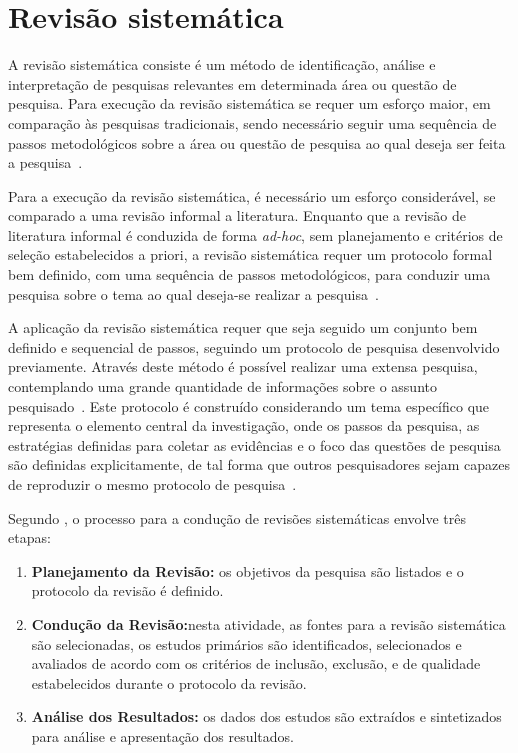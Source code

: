 \section{\label{sec:ApendiceA}Revisão sistemática}
\par
A revisão sistemática consiste é um método de identificação, análise e interpretação de pesquisas relevantes em determinada área ou questão de pesquisa. Para execução da revisão sistemática se requer um esforço maior, em comparação às pesquisas tradicionais, sendo necessário seguir uma sequência de passos metodológicos sobre a área ou questão de pesquisa ao qual deseja ser feita a pesquisa~\cite{kitchenham2004procedures}.

\par
Para a execução da revisão sistemática, é necessário um esforço considerável, se comparado a uma revisão informal a literatura. Enquanto que a revisão de literatura informal é conduzida de forma \textit{ad-hoc}, sem planejamento e critérios de seleção estabelecidos a priori, a revisão sistemática requer um protocolo formal bem definido, com uma sequência de passos metodológicos, para conduzir uma pesquisa sobre o tema ao qual deseja-se realizar a pesquisa~\cite{MafraTravassos}.

\par
A aplicação da revisão sistemática requer que seja seguido um conjunto bem definido e sequencial de passos, seguindo um protocolo de pesquisa desenvolvido previamente. Através deste método é possível realizar uma extensa pesquisa, contemplando uma grande quantidade de informações sobre o assunto pesquisado~\cite{MafraTravassos}. Este protocolo é construído considerando um tema específico que representa o elemento central da investigação, onde os passos da pesquisa, as estratégias definidas para coletar as evidências e o foco das questões de pesquisa são definidas explicitamente, de tal forma que outros pesquisadores sejam capazes de reproduzir o mesmo protocolo de pesquisa~\cite{biolchini2005systematic}.

\par
Segundo , o processo para a condução de revisões sistemáticas envolve três etapas:
\begin{enumerate}
  \item \textbf{Planejamento da Revisão:} os objetivos da pesquisa são listados e o protocolo da revisão é definido.
  \item \textbf{Condução da Revisão:}nesta atividade, as fontes para a revisão sistemática são selecionadas, os estudos primários são identificados, selecionados e avaliados de acordo com os critérios de inclusão, exclusão, e de qualidade estabelecidos durante o protocolo da revisão.
  \item \textbf{Análise dos Resultados:} os dados dos estudos são extraídos e sintetizados para análise e apresentação dos resultados.
\end{enumerate}

